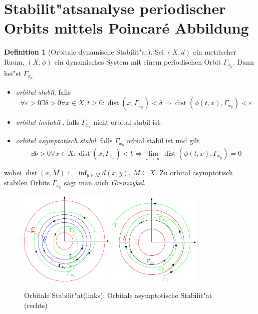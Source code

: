 \documentclass[a4paper, 13pt]{scrreprt}
\theoremstyle{definition} \newtheorem{definition}{Definition}[section]
\begin{document}
\section{Stabilit"atsanalyse periodischer Orbits mittels Poincar\'{e} Abbildung}
\begin{definition}[Orbitale dynamische Stabilit"at]
Sei $(X,d)$ ein metrischer Raum, $(X,\phi)$ ein dynamisches System mit einem periodischen Orbit $\Gamma_{x_p}$. Dann hei"st $\Gamma_{x_p}$ 
\begin{itemize}
\item \emph{orbital stabil}, falls 
	$$ \forall \varepsilon > 0 \exists \delta > 0 \forall x\in X, t\geq 0:
	\operatorname{dist}(x, \Gamma_{x_p}) < \delta \Rightarrow \operatorname{dist}(\phi(t,x), \Gamma_{x_p}) < \varepsilon$$
\item \emph{orbital instabil }, falls $\Gamma_{x_p}$ nicht orbital stabil ist.
\item \emph{orbital asymptotisch stabil}, falls $\Gamma_{x_p}$ orbial stabil ist und gilt
$$ \exists b > 0 \forall x \in X: \operatorname{dist}(x, \Gamma_{x_p}) < b \Rightarrow \lim_{t\to\infty}{\operatorname{dist}(\phi(t,x), \Gamma_{x_p})} = 0 $$
\end{itemize}
wobei $\operatorname{dist}(x, M) := \inf_{y\in M}{d(x,y)}, \ M\subseteq X$. Zu orbital asymptotisch stabilen Orbits $\Gamma_{x_p}$ sagt man auch \emph{Grenzzykel}.
\end{definition}
\begin{figure}[htpb]
		\centering
		\includegraphics[width=0.4\textwidth]{img/periodische_orbits/orbiale_stabilitaet.pdf}
		\includegraphics[width=0.4\textwidth]{img/periodische_orbits/orbitale_asymp_stabilitaet.pdf}
		\caption{Orbitale Stabilit"at(links); Orbitale asymptotische Stabilit"at (rechts)}
\end{figure}
\end{document}
